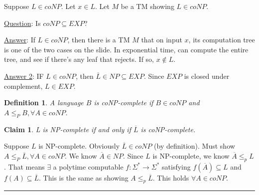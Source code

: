 \documentclass[twoside]{article}
\newtheorem{claim}[theorem]{Claim}
\newtheorem{definition}[theorem]{Definition}
\newenvironment{proof}{{\bf Proof:}}{\hfill\rule{2mm}{2mm}}
\begin{document}
Suppose $L \in coNP$. Let $x \in L$. Let $M$ be a \textsf{TM} showing $L \in coNP$.

\underline{Question}: Is $coNP \subseteq EXP$?

\underline{Answer}: If $L \in coNP$, then there is a \textsf{TM} $M$ that on input $x$, its computation tree is one of the two cases on the slide. In exponential time, can compute the entire tree, and see if there's any leaf that rejects. If so, $x \notin L$.

\underline{Answer 2}: IF $L \in coNP$, then $\overline{L} \in NP \subseteq EXP$. Since $EXP$ is closed under complement, $L \in EXP$.

\begin{definition}
  A language $B$ is coNP-complete if $B \in coNP$ and $A \leq_{P} B, \forall A \in coNP$.
\end{definition}

\begin{claim}
  L is NP-complete if and only if $\overline{L}$ is coNP-complete.
\end{claim}

\begin{proof}
  Suppose $L$ is NP-complete. Obviously $\overline{L} \in coNP$ (by definition). Must show $A \leq_{P} \overline{L}, \forall A \in coNP$. We know $\overline{A} \in NP$. Since $L$ is NP-complete, we know $\overline{A} \leq_{p} L$. That means $\exists$ a polytime computable $f : \Sigma^* \rightarrow \Sigma^*$ satisfying $f(\overline{A}) \subseteq L$ and $f(A) \subseteq \overline{L}$. This is the same as showing $A \leq_{p} \overline{L}$. This holds $\forall A \in coNP$.
\end{proof}
\end{document}
